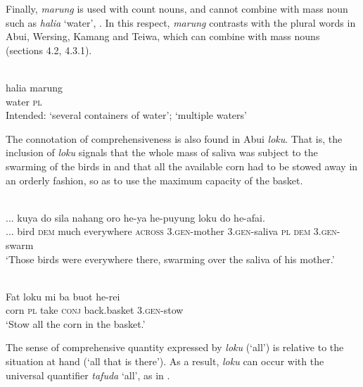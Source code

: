 Finally, \textit{marung} is used with count nouns, and cannot combine with mass noun such as \textit{halia} `water', . In this respect, \textit{marung} contrasts with the plural words in Abui, Wersing, Kamang and Teiwa, which can combine with mass nouns (sections 4.2,  4.3.1).


\ea%
\label{ex:9:68}
 \\
\gll  *halia marung \\
   water \textsc{pl}  \\
 Intended: `several containers of water';  `multiple waters'
\z






The connotation of comprehensiveness is also found in Abui \textit{loku}. That is, the inclusion of \textit{loku} signals that the whole mass of saliva was subject to the swarming of the birds in  and that all the available corn had to be stowed away  in an orderly fashion, so as to use the maximum capacity of the basket.


\ea%
\label{ex:9:69}
 \\
\gll  ... {kuya} do sila nahang oro  he-ya he-puyung loku do he-afai. \\
   ...  bird \textsc{dem} much everywhere \textsc{across}   \textsc{3.gen}-mother \textsc{3.gen-}saliva \textsc{pl} \textsc{dem} \textsc{3.gen-}swarm \\
\glt `Those birds were everywhere there, swarming over the saliva of his mother.'
\z













\ea%
\label{ex:9:70}
 \\
\gll  Fat loku mi ba buot he-rei \\
    corn \textsc{pl} take \textsc{conj} back.basket \textsc{3.gen-}stow \\
\glt `Stow all the corn in the basket.'
\z






The sense of comprehensive quantity expressed by \textit{loku} (`all') is relative to the situation at hand (`all that is there'). As a result, \textit{loku} can occur with the universal quantifier \textit{tafuda} `all', as in .




